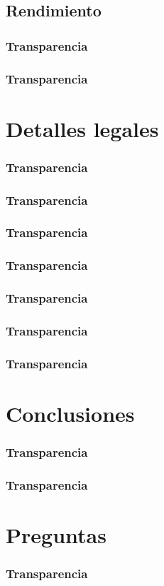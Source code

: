 \documentclass{beamer}
\begin{document}
    \subsection{Rendimiento}
    \begin{frame}
        \frametitle{Transparencia}
    \end{frame}
    \begin{frame}
        \frametitle{Transparencia}
    \end{frame}
    \section{Detalles legales}
    \begin{frame}
        \frametitle{Transparencia}
    \end{frame}
    \begin{frame}
        \frametitle{Transparencia}
    \end{frame}
    \begin{frame}
        \frametitle{Transparencia}
    \end{frame}
    \begin{frame}
        \frametitle{Transparencia}
    \end{frame}
    \begin{frame}
        \frametitle{Transparencia}
    \end{frame}
    \begin{frame}
        \frametitle{Transparencia}
    \end{frame}
    \begin{frame}
        \frametitle{Transparencia}
    \end{frame}
    \section{Conclusiones}
    \begin{frame}
        \frametitle{Transparencia}
    \end{frame}
    \begin{frame}
        \frametitle{Transparencia}
    \end{frame}
    \section{Preguntas}
    \begin{frame}
        \frametitle{Transparencia}
    \end{frame}
\end{document}
